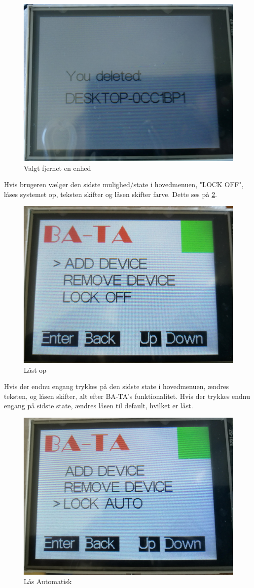 \begin{figure}[H]
	\centering
	\includegraphics[width = 300 pt]{Img/delete.jpg}
	\caption{Valgt fjernet en enhed}
	\label{fig:delete}
\end{figure}
Hvis brugeren vælger den sidste mulighed/state i hovedmenuen, "LOCK OFF", låses systemet op, teksten skifter og låsen skifter farve. Dette ses på \ref{fig:lockOff}.
\begin{figure}[H]
	\centering
	\includegraphics[width = 300 pt]{Img/lockOff.jpg}
	\caption{Låst op}
	\label{fig:lockOff}
\end{figure}
Hvis der endnu engang trykkes på den sidste state i hovedmenuen, ændres teksten, og låsen skifter, alt efter BA-TA's funktionalitet. Hvis der trykkes endnu engang på sidste state, ændres låsen til default, hvilket er låst. 
\begin{figure}[H]
	\centering
	\includegraphics[width = 300 pt]{Img/auto.jpg}
	\caption{Lås Automatisk}
	\label{fig:auto}
\end{figure}

